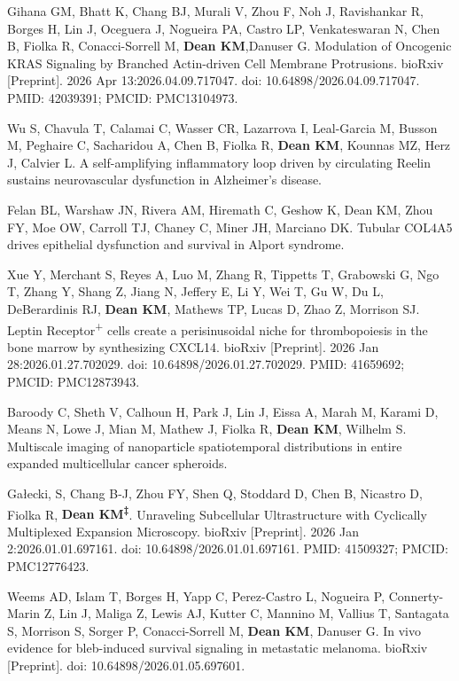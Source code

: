 \begin{etaremune}
\item Gihana GM, Bhatt K, Chang BJ, Murali V, Zhou F, Noh J, Ravishankar R, Borges H, Lin J, Oceguera J, Nogueira PA, Castro LP, Venkateswaran N, Chen B, Fiolka R, Conacci-Sorrell M, \textbf{Dean KM},Danuser G. Modulation of Oncogenic KRAS Signaling by Branched Actin-driven Cell Membrane Protrusions. bioRxiv [Preprint]. 2026 Apr 13:2026.04.09.717047. doi: 10.64898/2026.04.09.717047. PMID: 42039391; PMCID: PMC13104973.

\item Wu S, Chavula T, Calamai C, Wasser CR, Lazarrova I, Leal-Garcia M, Busson M, Peghaire C, Sacharidou A, Chen B, Fiolka R, \textbf{Dean KM}, Kounnas MZ, Herz J, Calvier L. A self-amplifying inflammatory loop driven by circulating Reelin sustains neurovascular dysfunction in Alzheimer’s disease.

\item Felan BL, Warshaw JN, Rivera AM, Hiremath C, Geshow K, Dean KM, Zhou FY, Moe OW, Carroll TJ, Chaney C, Miner JH, Marciano DK. Tubular COL4A5 drives epithelial dysfunction and survival in Alport syndrome. 

\item Xue Y, Merchant S, Reyes A, Luo M, Zhang R, Tippetts T, Grabowski G, Ngo T, Zhang Y, Shang Z, Jiang N, Jeffery E, Li Y, Wei T, Gu W, Du L, DeBerardinis RJ, \textbf{Dean KM}, Mathews TP, Lucas D, Zhao Z, Morrison SJ. Leptin Receptor\textsuperscript{+} cells create a perisinusoidal niche for thrombopoiesis in the bone marrow by synthesizing CXCL14. bioRxiv [Preprint]. 2026 Jan 28:2026.01.27.702029. doi: 10.64898/2026.01.27.702029. PMID: 41659692; PMCID: PMC12873943.

\item Baroody C, Sheth V, Calhoun H, Park J, Lin J, Eissa A, Marah M, Karami D, Means N, Lowe J, Mian M, Mathew J, Fiolka R, \textbf{Dean KM}, Wilhelm S. Multiscale imaging of nanoparticle spatiotemporal distributions in entire expanded multicellular cancer spheroids.

\item Ga\l{}ecki, S, Chang B-J, Zhou FY, Shen Q, Stoddard D, Chen B, Nicastro D, Fiolka R, \textbf{Dean KM\textsuperscript{‡}}. Unraveling Subcellular Ultrastructure with Cyclically Multiplexed Expansion Microscopy. bioRxiv [Preprint]. 2026 Jan 2:2026.01.01.697161. doi: 10.64898/2026.01.01.697161. PMID: 41509327; PMCID: PMC12776423.

\item Weems AD, Islam T, Borges H, Yapp C, Perez-Castro L, Nogueira P, Connerty-Marin Z, Lin J, Maliga Z, Lewis AJ, Kutter C, Mannino M, Vallius T, Santagata S, Morrison S, Sorger P, Conacci-Sorrell M, \textbf{Dean KM}, Danuser G. In vivo evidence for bleb-induced survival signaling in metastatic melanoma. bioRxiv [Preprint]. doi: 10.64898/2026.01.05.697601.


\end{etaremune}
